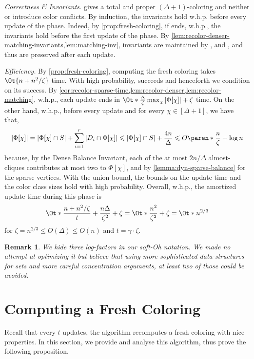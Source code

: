 \documentclass[a4paper,english,11pt]{amsart}
\newtheorem{remark}[lemma]{Remark}
\theoremstyle{definition}
\renewcommand{\qed}{\nobreak \ifvmode \relax \else
      \ifdim\lastskip<1.5em \hskip-\lastskip
      \hskip1.5em plus0em minus0.5em \fi \nobreak
      \vrule height0.75em width0.5em depth0.25em\fi}
\renewcommand{\leq}{\leqslant}
\DeclarePairedDelimiter{\paren}()
\newcommand{\whp}{$\text{w.h.p.}$\xspace}
\begin{document}
\emph{Correctness \& Invariants.} \FreshColoring gives a total and proper $(\Delta+1)$-coloring and neither \RecolorInsert or \RecolorDelete introduce color conflicts. By induction, the invariants hold \whp before every update of the phase. Indeed, by \cref{prop:fresh-coloring}, if \FreshColoring ends, \whp, the invariants hold before the first update of the phase.
By \cref{lem:recolor-denser-matching-invariants,lem:matching-inv}, invariants are maintained by \RecolorDense, \RecolorMatching and \RecolorSparse, and thus are preserved after each update.

\emph{Efficiency.} By \cref{prop:fresh-coloring}, computing the fresh coloring takes $\Ot{ n + n^2 / \zeta }$ time. With high probability, \FreshColoring succeeds and henceforth we condition on its success. By \cref{cor:recolor-sparse-time,lem:recolor-denser,lem:recolor-matching}, \whp, each update ends in $\Ot*{ \frac{\Delta}{\zeta} \max_\chi |\Phi[\chi]| + \zeta }$ time. On the other hand, \whp, before every update and for every $\chi \in [\Delta + 1]$, we have that,
\[
    |\Phi[\chi]|
    = |\Phi[\chi] \cap S| + \sum_{i = 1}^r |D_i \cap \Phi[\chi]|
    \leq |\Phi[\chi] \cap S| + \frac{4n}{\Delta}
    \leq O\paren*{ \frac{n}{\zeta} + \log n }
\]
because, by the Dense Balance Invariant, each of the at most $2n / \Delta$ almost-cliques contributes at most two to $\Phi[\chi]$, and by
\cref{lemma:dyn-sparse-balance} for the sparse vertices. With the union bound, the bounds on the update time and the color class sizes hold with high probability.
Overall, \whp, the amortized update time during this phase is
\[
\Ot*{
    \frac{n + n^2 / \zeta}{t}
    + \frac{ n \Delta }{ \zeta^2 } + \zeta
}
= \Ot*{ \frac{n^2}{\zeta^2} + \zeta }
= \Ot*{ n^{2/3} }
\]
for $\zeta = n^{2/3} \leq O( \Delta ) \leq O( n )$ and $t = \gamma \cdot \zeta$.
\qed

\begin{remark}
    We hide three log-factors in our soft-Oh notation. We made no attempt at optimizing it but believe that using more sophisticated data-structures for sets and more careful concentration arguments, at least two of those could be avoided.
\end{remark} \section{Computing a Fresh Coloring}
\label{sec:fresh}

Recall that every $t$ updates, the algorithm recomputes a fresh coloring with nice properties. In this section, we provide and analyse this algorithm, thus prove the following proposition.
\end{document}

